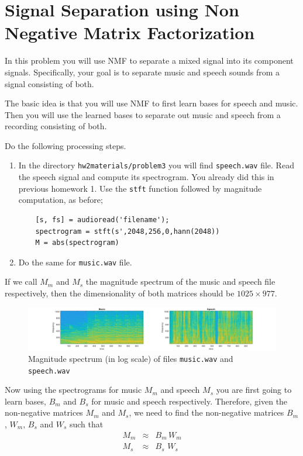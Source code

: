 
\section{Signal Separation using Non Negative Matrix Factorization}

In this problem you will use NMF to separate a mixed signal into its component signals. Specifically, your goal is to separate music and speech sounds from a signal consisting of both.

The basic idea is that you will use NMF to first learn bases for speech and music. Then you will use the learned bases to separate out music and speech from a recording consisting of both.

Do the following processing steps.
\begin{enumerate}
    \item  In the directory \texttt{hw2materials/problem3} you will find \texttt{speech.wav} file. Read the speech signal and compute its spectrogram. You already did this in previous homework 1. Use the \texttt{stft} function followed by magnitude computation, as before;  
    \begin{lstlisting}
    [s, fs] = audioread('filename');
    spectrogram = stft(s',2048,256,0,hann(2048))
    M = abs(spectrogram)
    \end{lstlisting}
    
    \item Do the same for \texttt{music.wav} file.
\end{enumerate}
If we call $M_m$ and $M_s$ the magnitude spectrum of the music and speech file respectively, then the dimensionality of both matrices should be $1025 \times 977$. 

\begin{figure}[h!]
    \centering
    \includegraphics[trim ={6cm 0 0 0 }, scale=0.3]{figs/music_speech.jpg}
    \caption{Magnitude spectrum (in log scale) of files \texttt{music.wav} and \texttt{speech.wav}}
    \label{face_example}
\end{figure}


Now using the spectrograms for music $M_m$ and speech $M_s$ you are first going to learn bases, $B_m$ and $B_s$ for music and speech respectively. Therefore, given the non-negative matrices $M_m$ and $M_s$, we need to find the non-negative matrices $B_m$, $W_m$, $B_s$ and $W_s$ such that
\begin{eqnarray}
    M_m & \approx & B_m \, W_m\\
    M_s & \approx & B_s \, \, W_s
\end{eqnarray}

